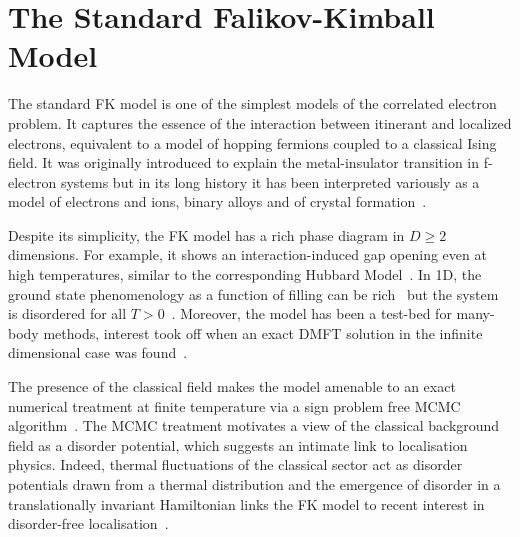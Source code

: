 \section{The Standard Falikov-Kimball Model}
The standard \acl{FK} model is one of the simplest models of the correlated electron problem. It captures the essence of the interaction between itinerant and localized electrons, equivalent to a model of hopping fermions coupled to a classical Ising field. It was originally introduced to explain the metal-insulator transition in f-electron systems but in its long history it has been interpreted variously as a model of electrons and ions, binary alloys and of crystal formation~\cite{hubbardj.ElectronCorrelationsNarrow1963, falicovSimpleModelSemiconductorMetal1969,gruberFalicovKimballModelReview1996,gruberFalicovKimballModel2006}. 

Despite its simplicity, the \ac{FK} model has a rich phase diagram in \(D \geq 2\) dimensions. For example, it shows an interaction-induced gap opening even at high temperatures, similar to the corresponding Hubbard Model~\cite{brandtThermodynamicsCorrelationFunctions1989}.  In 1D, the ground state phenomenology as a function of filling can be rich~\cite{gruberGroundStatesSpinless1990} but the system is disordered for all \(T > 0\)~\cite{kennedyItinerantElectronModel1986}. Moreover, the model has been a test-bed for many-body methods, interest took off when an exact DMFT solution in the infinite dimensional case was found~\cite{antipovCriticalExponentsStrongly2014,ribicNonlocalCorrelationsSpectral2016,freericksExactDynamicalMeanfield2003,herrmannNonequilibriumDynamicalCluster2016}. 

The presence of the classical field makes the model amenable to an exact numerical treatment at finite temperature via a sign problem free \ac{MCMC} algorithm~\cite{devriesGapsDensitiesStates1993,devriesSimplifiedHubbardModel1993,antipovInteractionTunedAndersonMott2016,debskiPossibilityDetectionFinite2016,herrmannSpreadingCorrelationsFalicovKimball2018,maskaThermodynamicsTwodimensionalFalicovKimball2006}. The \ac{MCMC} treatment motivates a view of the classical background field as a disorder potential, which suggests an intimate link to localisation physics. Indeed, thermal fluctuations of the classical sector act as disorder potentials drawn from a thermal distribution and the emergence of disorder in a translationally invariant Hamiltonian links the \ac{FK} model to recent interest in disorder-free localisation~\cite{smithDisorderFreeLocalization2017,smithDynamicalLocalizationMathbbZ2018,brenesManyBodyLocalizationDynamics2018}.


